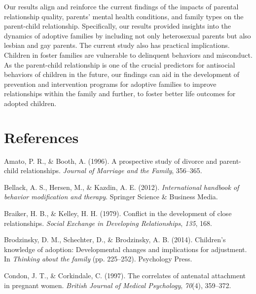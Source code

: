 \documentclass[man]{apa6}
\begin{document}
Our results align and reinforce the current findings of the impacts of parental relationship quality, parents' mental health conditions, and family types on the parent-child relationship. Specifically, our results provided insights into the dynamics of adoptive families by including not only heterosexual parents but also lesbian and gay parents. The current study also has practical implications. Children in foster families are vulnerable to delinquent behaviors and misconduct. As the parent-child relationship is one of the crucial predictors for antisocial behaviors of children in the future, our findings can aid in the development of prevention and intervention programs for adoptive families to improve relationships within the family and further, to foster better life outcomes for adopted children.

\newpage

\hypertarget{references}{%
\section{References}\label{references}}

\begingroup
\setlength{\parindent}{-0.5in}
\setlength{\leftskip}{0.5in}

\hypertarget{refs}{}
\leavevmode\hypertarget{ref-amato1996prospective}{}%
Amato, P. R., \& Booth, A. (1996). A prospective study of divorce and parent-child relationships. \emph{Journal of Marriage and the Family}, 356--365.

\leavevmode\hypertarget{ref-bellack2012international}{}%
Bellack, A. S., Hersen, M., \& Kazdin, A. E. (2012). \emph{International handbook of behavior modification and therapy}. Springer Science \& Business Media.

\leavevmode\hypertarget{ref-braiker1979conflict}{}%
Braiker, H. B., \& Kelley, H. H. (1979). Conflict in the development of close relationships. \emph{Social Exchange in Developing Relationships}, \emph{135}, 168.

\leavevmode\hypertarget{ref-brodzinsky2014children}{}%
Brodzinsky, D. M., Schechter, D., \& Brodzinsky, A. B. (2014). Children's knowledge of adoption: Developmental changes and implications for adjustment. In \emph{Thinking about the family} (pp. 225--252). Psychology Press.

\leavevmode\hypertarget{ref-condon1997correlates}{}%
Condon, J. T., \& Corkindale, C. (1997). The correlates of antenatal attachment in pregnant women. \emph{British Journal of Medical Psychology}, \emph{70}(4), 359--372.
\end{document}
